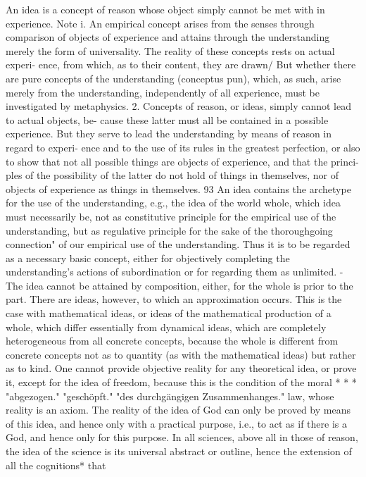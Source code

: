 An idea is a concept of reason whose object simply cannot be met with
in experience.
Note i. An empirical concept arises from the senses through comparison of
objects of experience and attains through the understanding merely the
form of universality. The reality of these concepts rests on actual experi-
ence, from which, as to their content, they are drawn/ But whether there
are pure concepts of the understanding (conceptus pun), which, as such, arise
merely from the understanding, independently of all experience, must be
investigated by metaphysics.
2. Concepts of reason, or ideas, simply cannot lead to actual objects, be-
cause these latter must all be contained in a possible experience. But they
serve to lead the understanding by means of reason in regard to experi-
ence and to the use of its rules in the greatest perfection, or also to show
that not all possible things are objects of experience, and that the princi-
ples of the possibility of the latter do not hold of things in themselves, nor
of objects of experience as things in themselves.
93
An idea contains the archetype for the use of the understanding, e.g., the
idea of the world whole, which idea must necessarily be, not as constitutive
principle for the empirical use of the understanding, but as regulative
principle for the sake of the thoroughgoing connection" of our empirical
use of the understanding. Thus it is to be regarded as a necessary basic
concept, either for objectively completing the understanding's actions of
subordination or for regarding them as unlimited. - The idea cannot be
attained by composition, either, for the whole is prior to the part. There are
ideas, however, to which an approximation occurs. This is the case with
mathematical ideas, or ideas of the mathematical production of a whole, which
differ essentially from dynamical ideas, which are completely heterogeneous
from all concrete concepts, because the whole is different from concrete
concepts not as to quantity (as with the mathematical ideas) but rather as
to kind.
One cannot provide objective reality for any theoretical idea, or prove it,
except for the idea of freedom, because this is the condition of the moral
*
*
*
"abgezogen."
"geschöpft."
"des durchgängigen Zusammenhanges."
law, whose reality is an axiom. The reality of the idea of God can only be
proved by means of this idea, and hence only with a practical purpose, i.e.,
to act as if there is a God, and hence only for this purpose.
In all sciences, above all in those of reason, the idea of the science is its
universal abstract or outline, hence the extension of all the cognitions* that
